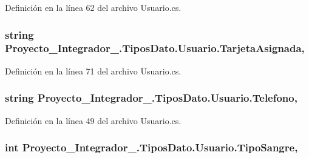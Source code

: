 Definición en la línea 62 del archivo Usuario.\-cs.

\hypertarget{class_proyecto___integrador__3_1_1_tipos_dato_1_1_usuario_a4ecaaf4c0f0b8e78d71fcab8c7da253a}{
\subsubsection[{Tarjeta\-Asignada}]{\setlength{\rightskip}{0pt plus 5cm}string Proyecto\-\_\-\-Integrador\-\_.\-Tipos\-Dato.\-Usuario.\-Tarjeta\-Asignada\hspace{0.3cm}{\ttfamily [get]}, {\ttfamily [set]}}}\label{class_proyecto___integrador__3_1_1_tipos_dato_1_1_usuario_a4ecaaf4c0f0b8e78d71fcab8c7da253a}


Definición en la línea 71 del archivo Usuario.\-cs.

\hypertarget{class_proyecto___integrador__3_1_1_tipos_dato_1_1_usuario_a576131d83803eab74ec85992416f1220}{
\subsubsection[{Telefono}]{\setlength{\rightskip}{0pt plus 5cm}string Proyecto\-\_\-\-Integrador\-\_.\-Tipos\-Dato.\-Usuario.\-Telefono\hspace{0.3cm}{\ttfamily [get]}, {\ttfamily [set]}}}\label{class_proyecto___integrador__3_1_1_tipos_dato_1_1_usuario_a576131d83803eab74ec85992416f1220}


Definición en la línea 49 del archivo Usuario.\-cs.

\hypertarget{class_proyecto___integrador__3_1_1_tipos_dato_1_1_usuario_a03896a1cdb77ff1166088f707b65896c}{
\subsubsection[{Tipo\-Sangre}]{\setlength{\rightskip}{0pt plus 5cm}int Proyecto\-\_\-\-Integrador\-\_.\-Tipos\-Dato.\-Usuario.\-Tipo\-Sangre\hspace{0.3cm}{\ttfamily [get]}, {\ttfamily [set]}}}\label{class_proyecto___integrador__3_1_1_tipos_dato_1_1_usuario_a03896a1cdb77ff1166088f707b65896c}


